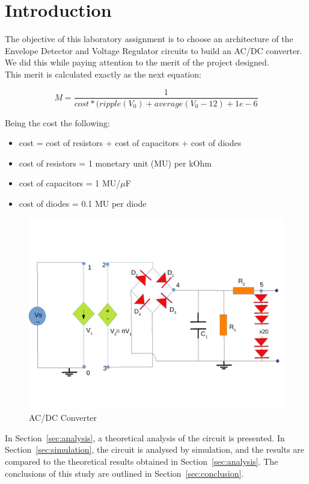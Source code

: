 \newpage
\section{Introduction}
\label{sec:introduction}

The objective of this laboratory assignment is to choose an architecture of the Envelope Detector and Voltage Regulator circuits to build an AC/DC converter. We did this while paying attention to the merit of the project designed.\\
This merit is calculated exactly as the next equation:

\begin{equation} 
M = \frac{1}{cost*(ripple(V_{0}) + average(V_{0}-12) + 1e-6}
\label{eq1}
\end{equation}

Being the cost the following:
\begin{itemize}
	\item cost = cost of resistors  + cost of capacitors + cost of diodes
	\item cost of resistors = 1 monetary unit (MU) per kOhm
	\item cost of capacitors = 1 MU/$\mu$F
	\item cost of diodes = 0.1 MU per diode
	
\end{itemize}

\begin{figure}[H] 
\centering
\includegraphics[width=\textwidth]{lab3draw.pdf} 
\caption{AC/DC Converter}
\label{fig:first}

\end{figure}

In Section~\ref{sec:analysis}, a theoretical analysis of the circuit is
presented. In Section~\ref{sec:simulation}, the circuit is analysed by
simulation, and the results are compared to the theoretical results obtained in
Section~\ref{sec:analysis}. The conclusions of this study are outlined in
Section~\ref{sec:conclusion}. \\


